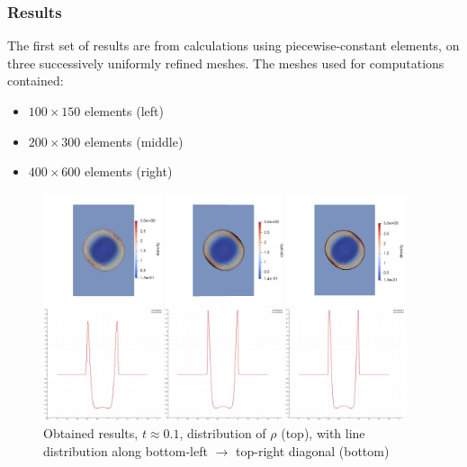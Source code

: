 \subsubsection{Results}
The first set of results are from calculations using piecewise-constant elements, on three successively uniformly refined meshes. The meshes used for computations  contained:
\begin{itemize}
\item $100 \times 150$ elements (left)
\item $200 \times 300$ elements (middle)
\item $400 \times 600$ elements (right)
\end{itemize}

\begin{figure}[H]
	\begin{center}
		\includegraphics[width=0.95\textwidth]{img/mhd-blast/new/blast,noadapt1.jpg}
	\caption{Obtained results, $t \approx 0.1$, distribution of $\rho$ (top), with line distribution along bottom-left $\rightarrow$ top-right diagonal (bottom)}
	\label{figure:blastNew01}
	\end{center}
\end{figure}
\vspace{-8mm}

